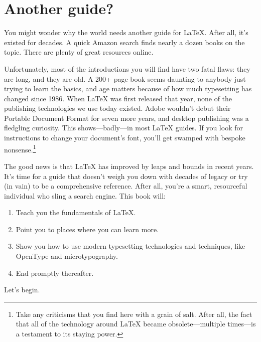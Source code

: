 \section{Another guide?}

You might wonder why the world needs another guide for \LaTeX{}.
After all, it's existed for decades.
A quick Amazon search finds nearly a dozen books on the topic.
There are plenty of great resources online.

Unfortunately, most of the introductions you will find have two fatal flaws:
they are long, and they are old.
A 200+ page book seems daunting to anybody just trying to learn the basics,
and age matters because of how much typesetting has changed since 1986.
When \LaTeX{} was first released that year, none of the publishing technologies
we use today existed.
Adobe wouldn't debut their Portable Document Format for seven more years,
and desktop publishing was a fledgling curiosity.
This shows---badly---in most \LaTeX{} guides.
If you look for instructions to change your document's font,
you'll get swamped with bespoke nonsense.\punckern\footnote{%
Take any criticisms that you find here with a grain of
salt. After all, the fact that all of the technology around \LaTeX{} became
obsolete---multiple times---is a testament to its staying power.}

The good news is that  \LaTeX{} has improved by leaps and bounds in recent years.
It's time for a guide that doesn't weigh you down with decades of legacy
or try (in vain) to be a comprehensive reference.
After all, you're a smart, resourceful individual who sling a search engine.
This book will:

\begin{enumerate}
\item Teach you the fundamentals of \LaTeX.
\item Point you to places where you can learn more.
\item Show you how to use modern typesetting technologies and techniques,
    like OpenType and microtypography.
\item End promptly thereafter.
\end{enumerate}
\vspace{\baselineskip}

\noindent Let's begin.
